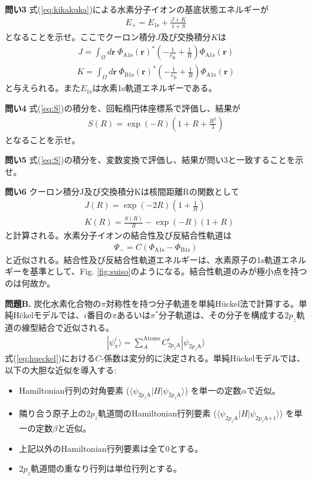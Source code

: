 \documentclass[11pt,pra,aps]{revtex4}
\begin{document}
\noindent
{\bf 問い3} 式(\ref{eq:kikakuka})による水素分子イオンの基底状態エネルギーが
\begin{align}
  E_+=E_\text{1s}+\frac{J+K}{1+S}
\end{align}    
となることを示せ。ここでクーロン積分$J$及び交換積分$K$は
\begin{align}
  J=\int_\Omega d\mathbf{r} \ \Phi_\text{A1s}(\mathbf{r})^{*} \left(-\frac{1}{r_\text{B}}+\frac{1}{R}\right) \Phi_\text{A1s}(\mathbf{r})
\end{align}
\begin{align}
  K=\int_\Omega d\mathbf{r} \ \Phi_\text{B1s}(\mathbf{r})^{*} \left(-\frac{1}{r_\text{B}}+\frac{1}{R}\right) \Phi_\text{A1s}(\mathbf{r})
\end{align}
と与えられる。また$E_\text{1s}$は水素1s軌道エネルギーである。

\noindent
{\bf 問い4} 式(\ref{eq:S})の積分を、回転楕円体座標系で評価し、結果が
\begin{align}
  S(R)=\exp(-R)\left(1+R+\frac{R^2}{3}\right)
\end{align}
となることを示せ。

\noindent
{\bf 問い5} 式(\ref{eq:S})の積分を、変数変換で評価し、結果が問い3と一致することを示せ。

\noindent
{\bf 問い6} クーロン積分J及び交換積分Kは核間距離Rの関数として
\begin{align}
  &J(R)=\exp(-2R)\left(1+\frac{1}{R}\right) \label{eq:J} \\
  &K(R)=\frac{S(R)}{R}-\exp(-R)\left(1+R\right) \label{eq:K}
\end{align}
と計算される。水素分子イオンの結合性及び反結合性軌道は
\begin{align}
  \Psi_{-}=C(\Phi_\text{A1s}-\Phi_\text{B1s})\label{eq:hanketugou}
\end{align}
と近似される。結合性及び反結合性軌道エネルギーは、水素原子の1s軌道エネルギーを基準として、Fig. \ref{fig:suiso}のようになる。結合性軌道のみが極小点を持つのは何故か。

\noindent
    {\bf 問題B.} 炭化水素化合物の$\pi$対称性を持つ分子軌道を単純H\"uckel法で計算する。単純H\"ckelモデルでは、$i$番目の$\pi$あるいは$\pi^*$分子軌道は、その分子を構成する$2p_z$軌道の線型結合で近似される。
\begin{align}
  |\psi_\pi^i\rangle=\sum_A^\text{Atoms}C^i_{2p_z\text{A}}|\psi_{2p_z\text{A}}\rangle \label{eq:hueckel}
\end{align}
式(\ref{eq:hueckel})における$C$-係数は変分的に決定される。単純H\"uckelモデルでは、以下の大胆な近似を導入する:
\begin{itemize}
\item Hamiltonian行列の対角要素 ($\langle\psi_{2p_z\text{A}}|H|\psi_{2p_z\text{A}}\rangle$) を単一の定数$\alpha$で近似。
\item 隣り合う原子上の$2p_z$軌道間のHamiltonian行列要素 ($\langle\psi_{2p_z\text{A}}|H|\psi_{2p_z\text{A+1}}\rangle$) を単一の定数$\beta$と近似。
\item 上記以外のHamiltonian行列要素は全て0とする。
\item $2p_z$軌道間の重なり行列は単位行列とする。
\end{itemize}
\end{document}
